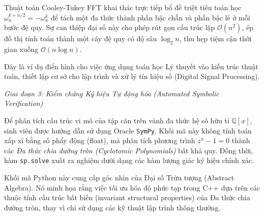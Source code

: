 \documentclass{article}
\begin{document}
Thuật toán Cooley-Tukey FFT khai thác trực tiếp bổ đề triệt tiêu toán học $\omega_n^{k + n/2} = -\omega_n^k$ để tách một đa thức thành phần bậc chẵn và phần bậc lẻ ở mỗi bước đệ quy. Sự can thiệp đại số này cho phép rút gọn cấu trúc lặp $\mathcal{O}(n^2)$, ép đồ thị tính toán thành một cây đệ quy có độ sâu $\log_2 n$, thu hẹp tiệm cận thời gian xuống $\mathcal{O}(n \log n)$. 

Đây là ví dụ điển hình cho việc ứng dụng toán học Lý thuyết vào kiến trúc thuật toán, thiết lập cơ sở cho lập trình và xử lý tín hiệu số (Digital Signal Processing).

\vspace{0.5em}\noindent\emph{Giai đoạn 3: Kiểm chứng Ký hiệu Tự động hóa (Automated Symbolic Verification)}

Để phân tích cấu trúc vi mô của tập căn trên vành đa thức hệ số hữu tỉ $\mathbb{Q}[x]$, sinh viên được hướng dẫn sử dụng Oracle \texttt{\textsf{SymPy}}. Khối mã này không tính toán xấp xỉ bằng số phẩy động (float), mà phân tích phương trình $z^n - 1 = 0$ thành các \textit{Đa thức chia đường tròn (Cyclotomic Polynomials)} bất khả quy. Đồng thời, hàm \texttt{sp.solve} xuất ra nghiệm dưới dạng các hàm lượng giác ký hiệu chính xác.


Khối mã Python này cung cấp góc nhìn của Đại số Trừu tượng (Abstract Algebra). Nó minh họa rằng việc tối ưu hóa độ phức tạp trong C++ dựa trên các thuộc tính cấu trúc bất biến (invariant structural properties) của Đa thức chia đường tròn, thay vì chỉ sử dụng các kỹ thuật lập trình thông thường.
\end{document}
